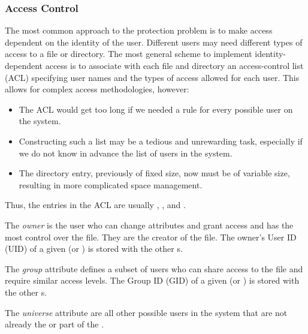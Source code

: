 \subsubsection{Access Control}\label{subsubsec:Access_Control}
The most common approach to the protection problem is to make access dependent on the identity of the user.
Different users may need different types of access to a file or directory.
The most general scheme to implement identity-dependent access is to associate with each file and directory an access-control list (ACL) specifying user names and the types of access allowed for each user.
This allows for complex access methodologies, however:
\begin{itemize}[noitemsep]
\item The ACL would get too long if we needed a rule for every possible user on the system.
\item Constructing such a list may be a tedious and unrewarding task, especially if we do not know in advance the list of users in the system.
\item The directory entry, previously of fixed size, now must be of variable size, resulting in more complicated space management.
\end{itemize}

Thus, the entries in the ACL are usually , , and .
\begin{definition}[Owner]\label{def:File_Owner}
  The \emph{owner} is the user who can change attributes and grant access and has the most control over the file.
  They are the creator of the file.
  The owner's User ID (UID) of a given  (or ) is stored with the other s.
\end{definition}

\begin{definition}[Group]\label{def:File_Group}
  The \emph{group} attribute defines a subset of users who can share access to the file and require similar access levels.
  The Group ID (GID) of a given  (or ) is stored with the other s.
\end{definition}

\begin{definition}[Universe]\label{def:File_Universe}
  The \emph{universe} attribute are all other possible users in the system that are not already the  or part of the .
\end{definition}

